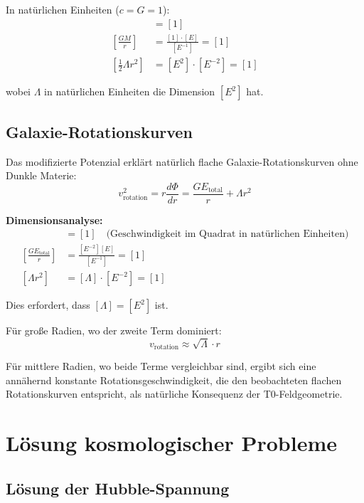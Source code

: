 \documentclass[12pt,a4paper]{report}
\begin{document}
In natürlichen Einheiten ($c = G = 1$):
\begin{align}
	[\Phi(r)] &= [1] \\
	\left[\frac{GM}{r}\right] &= \frac{[1] \cdot [E]}{[E^{-1}]} = [1] \\
	\left[\frac{1}{2}\Lambda r^2\right] &= [E^2] \cdot [E^{-2}] = [1]
\end{align}

wobei $\Lambda$ in natürlichen Einheiten die Dimension $[E^2]$ hat.	
\subsection{Galaxie-Rotationskurven}
\label{subsec:galaxy_rotation_curves}

Das modifizierte Potenzial erklärt natürlich flache Galaxie-Rotationskurven ohne Dunkle Materie:
\begin{equation}
	v_{\text{rotation}}^2 = r \frac{d\Phi}{dr} = \frac{GE_{\text{total}}}{r} + \Lambda r^2
\end{equation}

\textbf{Dimensionsanalyse:}
\begin{align}
	[v_{\text{rotation}}^2] &= [1] \quad \text{(Geschwindigkeit im Quadrat in natürlichen Einheiten)} \\
	\left[\frac{GE_{\text{total}}}{r}\right] &= \frac{[E^{-2}][E]}{[E^{-1}]} = [1] \\
	[\Lambda r^2] &= [\Lambda] \cdot [E^{-2}] = [1]
\end{align}

Dies erfordert, dass $[\Lambda] = [E^2]$ ist.

Für große Radien, wo der zweite Term dominiert:
\begin{equation}
	v_{\text{rotation}} \approx \sqrt{\Lambda} \cdot r
\end{equation}

Für mittlere Radien, wo beide Terme vergleichbar sind, ergibt sich eine annähernd konstante Rotationsgeschwindigkeit, die den beobachteten flachen Rotationskurven entspricht, als natürliche Konsequenz der T0-Feldgeometrie.
	\section{Lösung kosmologischer Probleme}
	\label{sec:cosmological_problems}
	
	\subsection{Lösung der Hubble-Spannung}
	\label{subsec:hubble_tension_resolution}
	
\end{document}
